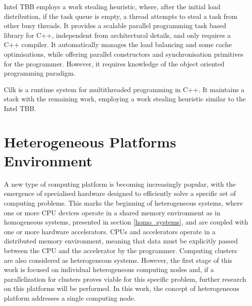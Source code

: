Intel TBB employs a work stealing heuristic, where, after the initial load distribution, if the task queue is empty, a thread attempts to steal a task from other busy threads. It provides a scalable parallel programming task based library for C++, independent from architectural details, and only requires a \intel C++ compiler. It automatically manages the load balancing and some cache optimisations, while offering parallel constructors and synchronisation primitives for the programmer. However, it requires knowledge of the object oriented programming paradigm.

Cilk is a runtime system for multithreaded programming in C++. It maintains a stack with the remaining work, employing a work stealing heuristic similar to the Intel TBB.

\section{Heterogeneous Platforms Environment}
\label{hetero_systems}

A new type of computing platform is becoming increasingly popular, with the emergence of specialised hardware designed to efficiently solve a specific set of computing problems. This marks the beginning of heterogeneous systems, where one or more CPU devices operate in a shared memory environment as in homogeneous systems, presented in section \ref{homo_systems}, and are coupled with one or more hardware accelerators. CPUs and accelerators operate in a distributed memory environment, meaning that data must be explicitly passed between the CPU and the accelerator by the programmer. Computing clusters are also considered as heterogeneous systems. However, the first stage of this work is focused on individual heterogeneous computing nodes and, if a parallelization for clusters proves viable for this specific problem, further research on this platforms will be performed. In this work, the concept of heterogeneous platform addresses a single computing node.

